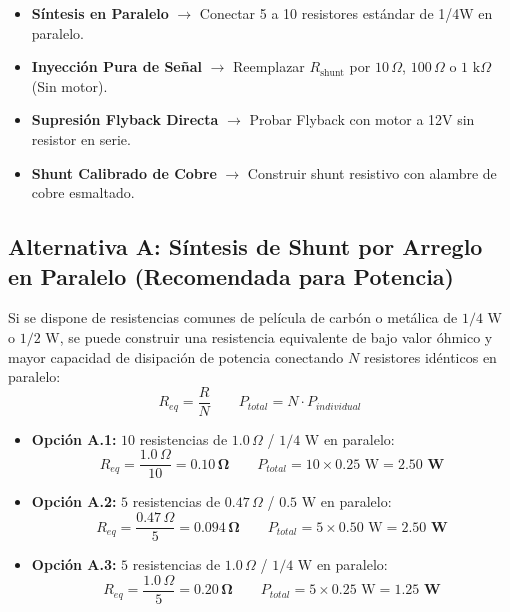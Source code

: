 \documentclass[11pt, a4paper]{article}
\begin{document}
\vspace{0.3cm}
\begin{cajaopciones}
    \begin{itemize}
        \item[\textbf{A.}] \textbf{Síntesis en Paralelo} $\longrightarrow$ Conectar 5 a 10 resistores estándar de 1/4W en paralelo.
        \item[\textbf{B.}] \textbf{Inyección Pura de Señal} $\longrightarrow$ Reemplazar $R_{\text{shunt}}$ por $10\,\Omega$, $100\,\Omega$ o $1\text{ k}\Omega$ (Sin motor).
        \item[\textbf{C.}] \textbf{Supresión Flyback Directa} $\longrightarrow$ Probar Flyback con motor a 12V sin resistor en serie.
        \item[\textbf{D.}] \textbf{Shunt Calibrado de Cobre} $\longrightarrow$ Construir shunt resistivo con alambre de cobre esmaltado.
    \end{itemize}
\end{cajaopciones}
\vspace{0.3cm}

\subsection*{Alternativa A: Síntesis de Shunt por Arreglo en Paralelo (Recomendada para Potencia)}
Si se dispone de resistencias comunes de película de carbón o metálica de $1/4\text{ W}$ o $1/2\text{ W}$, se puede construir una resistencia equivalente de bajo valor óhmico y mayor capacidad de disipación de potencia conectando $N$ resistores idénticos en paralelo:
\begin{equation}
    R_{eq} = \frac{R}{N} \qquad P_{total} = N \cdot P_{individual}
\end{equation}

\begin{itemize}
    \item \textbf{Opción A.1:} $10$ resistencias de $1.0\,\Omega$ / $1/4\text{ W}$ en paralelo:
    $$R_{eq} = \frac{1.0\,\Omega}{10} = \mathbf{0.10\,\Omega} \qquad P_{total} = 10 \times 0.25\text{ W} = \mathbf{2.50\text{ W}}$$
    
    \item \textbf{Opción A.2:} $5$ resistencias de $0.47\,\Omega$ / $0.5\text{ W}$ en paralelo:
    $$R_{eq} = \frac{0.47\,\Omega}{5} = \mathbf{0.094\,\Omega} \qquad P_{total} = 5 \times 0.50\text{ W} = \mathbf{2.50\text{ W}}$$
    
    \item \textbf{Opción A.3:} $5$ resistencias de $1.0\,\Omega$ / $1/4\text{ W}$ en paralelo:
    $$R_{eq} = \frac{1.0\,\Omega}{5} = \mathbf{0.20\,\Omega} \qquad P_{total} = 5 \times 0.25\text{ W} = \mathbf{1.25\text{ W}}$$
\end{itemize}
\end{document}
